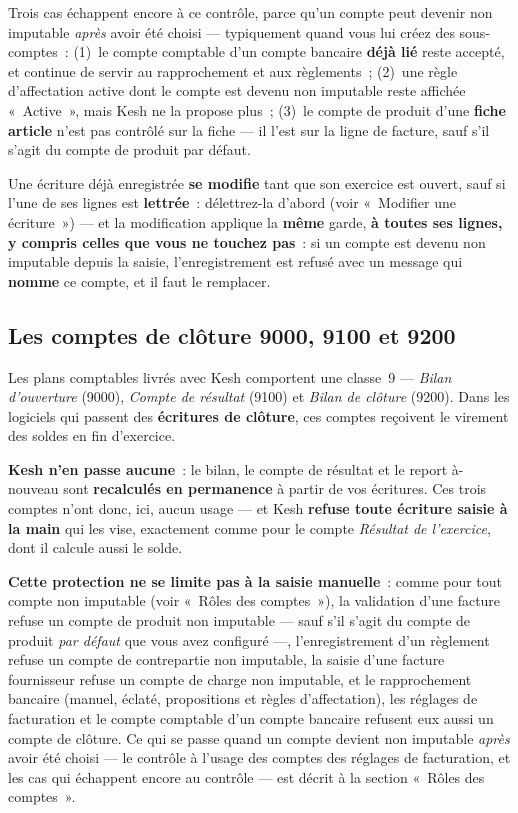 \documentclass[a4paper,11pt,oneside]{article}
\begin{document}
\begin{keshnote}
Trois cas échappent encore à ce contrôle, parce qu'un compte peut devenir non imputable \emph{après} avoir été choisi — typiquement quand vous lui créez des sous-comptes~: (1)~le compte comptable d'un compte bancaire \textbf{déjà lié} reste accepté, et continue de servir au rapprochement et aux règlements~; (2)~une règle d'affectation active dont le compte est devenu non imputable reste affichée «~Active~», mais Kesh ne la propose plus~; (3)~le compte de produit d'une \textbf{fiche article} n'est pas contrôlé sur la fiche — il l'est sur la ligne de facture, sauf s'il s'agit du compte de produit par défaut.

Une écriture déjà enregistrée \textbf{se modifie} tant que son exercice est ouvert, sauf si l'une de ses lignes est \textbf{lettrée}~: délettrez-la d'abord (voir «~Modifier une écriture~») --- et la modification applique la \textbf{même} garde, \textbf{à toutes ses lignes, y compris celles que vous ne touchez pas}~: si un compte est devenu non imputable depuis la saisie, l'enregistrement est refusé avec un message qui \textbf{nomme} ce compte, et il faut le remplacer.
\end{keshnote}

\subsection{Les comptes de clôture 9000, 9100 et 9200}

Les plans comptables livrés avec Kesh comportent une classe~9 — \emph{Bilan d'ouverture} (9000), \emph{Compte de résultat} (9100) et \emph{Bilan de clôture} (9200). Dans les logiciels qui passent des \textbf{écritures de clôture}, ces comptes reçoivent le virement des soldes en fin d'exercice.

\textbf{Kesh n'en passe aucune}~: le bilan, le compte de résultat et le report à-nouveau sont \textbf{recalculés en permanence} à partir de vos écritures. Ces trois comptes n'ont donc, ici, aucun usage — et Kesh \textbf{refuse toute écriture saisie à la main} qui les vise, exactement comme pour le compte \emph{Résultat de l'exercice}, dont il calcule aussi le solde.

\begin{keshnote}
\textbf{Cette protection ne se limite pas à la saisie manuelle}~: comme pour tout compte non imputable (voir «~Rôles des comptes~»), la validation d'une facture refuse un compte de produit non imputable — sauf s'il s'agit du compte de produit \emph{par défaut} que vous avez configuré —, l'enregistrement d'un règlement refuse un compte de contrepartie non imputable, la saisie d'une facture fournisseur refuse un compte de charge non imputable, et le rapprochement bancaire (manuel, éclaté, propositions et règles d'affectation), les réglages de facturation et le compte comptable d'un compte bancaire refusent eux aussi un compte de clôture. Ce qui se passe quand un compte devient non imputable \emph{après} avoir été choisi --- le contrôle à l'usage des comptes des réglages de facturation, et les cas qui échappent encore au contrôle --- est décrit à la section «~Rôles des comptes~».
\end{keshnote}
\end{document}
